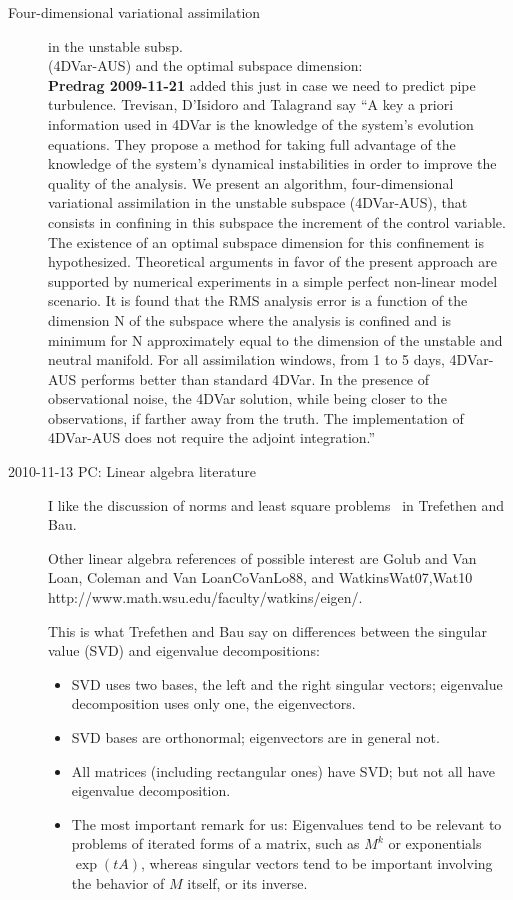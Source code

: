 \begin{description}
\item[Four-dimensional variational assimilation]
	{in the unstable subsp. \\
      (4DVar-AUS) and the optimal subspace dimension}:
	\\
{\bf Predrag
2009-11-21} added this just in case we need to predict pipe turbulence.
Trevisan, D'Isidoro and Talagrand say
``A key a priori information used in 4DVar is the knowledge of the
system's evolution equations. They propose a method for taking full
advantage of the knowledge of the system's dynamical instabilities in
order to improve the quality of the analysis. We present an
algorithm, four-dimensional variational assimilation in the unstable
subspace (4DVar-AUS), that consists in confining in this subspace the
increment of the control variable. The existence of an optimal
subspace dimension for this confinement is hypothesized. Theoretical
arguments in favor of the present approach are supported by numerical
experiments in a simple perfect non-linear model scenario. It is
found that the RMS analysis error is a function of the dimension N of
the subspace where the analysis is confined and is minimum for N
approximately equal to the dimension of the unstable and neutral
manifold. For all assimilation windows, from 1 to 5 days, 4DVar-AUS
performs better than standard 4DVar. In the presence of observational
noise, the 4DVar solution, while being closer to the observations, if
farther away from the truth. The implementation of 4DVar-AUS does not
require the adjoint integration.''

\item[2010-11-13 PC: Linear algebra literature]
I like the discussion of norms and least square problems \etc\
in Trefethen and Bau.

Other linear algebra references of possible interest are
Golub and Van Loan,
Coleman and Van Loan{CoVanLo88}, and Watkins{Wat07,Wat10}
  {http://www.math.wsu.edu/faculty/watkins/eigen/}.

This is what Trefethen and Bau say on differences between
the singular value (SVD) and eigenvalue decompositions:
\begin{itemize}
  \item SVD uses two bases, the left and the right singular vectors;
eigenvalue decomposition uses only one, the eigenvectors.
  \item SVD bases are orthonormal; eigenvectors are in general not.
  \item All matrices (including rectangular ones) have SVD; but not all
have eigenvalue decomposition.
	\item The most important remark for us: Eigenvalues tend to be relevant to
problems of iterated forms of a matrix, such as $M^k$ or exponentials
$\exp(t A)$, whereas singular vectors tend to be important involving
the behavior of $M$ itself, or its inverse.
\end{itemize}


\end{description}
